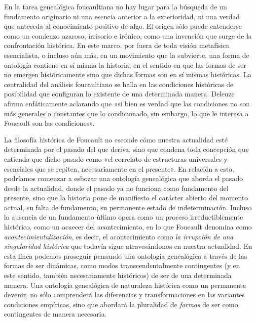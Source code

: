 En la tarea genealógica foucaultiana no hay lugar para la búsqueda de un fundamento originario ni una esencia anterior a la exterioridad, ni una verdad que anteceda al conocimiento positivo de algo. El origen sólo puede entenderse como un comienzo azaroso, irrisorio e irónico, como una invención que surge de la confrontación histórica. En este marco, por fuera de toda visión metafísica esencialista, o incluso aún más, en un movimiento que la subvierte, una forma de ontología contiene en sí misma la historia, en el sentido en que las formas de ser no emergen históricamente sino que dichas formas son en sí mismas históricas. La centralidad del análisis foucaultiano se halla en las condiciones históricas de posibilidad que configuran lo existente de una determinada manera. Deleuze afirma enfáticamente aclarando que «si bien es verdad que las condiciones no son más generales o constantes que lo condicionado, sin embargo, lo que le interesa a Foucault son las condiciones».

La filosofía histórica de Foucault no esconde cómo nuestra actualidad esté determinada por el pasado del que deriva, sino que condena toda concepción que entienda que dicho pasado como «el correlato de estructuras universales y esenciales que se repiten, necesariamente en el presente». En relación a esto, podríamos comenzar a esbozar una ontología genealógica que aborda el pasado desde la actualidad, donde el pasado ya no funciona como fundamento del presente, sino que la historia pone de manifiesto el carácter abierto del momento actual, su falta de fundamento, su permanente estado de indeterminación. Incluso la ausencia de un fundamento último opera como un proceso irreductiblemente histórico, como un acaecer del acontecimiento, en lo que Foucault denomina como \emph{acontecimientalización}, es decir, el acontecimiento como \emph{la irrupción de una singularidad histórica} que todavía sigue atravesándonos en nuestra actualidad. En esta línea podemos proseguir pensando una ontología genealógica a través de las formas de ser dinámicas, como modos transcendentalmente contingentes (y en este sentido, también necesariamente históricos) de ser de una determinada manera. Una ontología genealógica de naturaleza histórica como un permanente devenir, no sólo comprenderá las diferencias y transformaciones en las variantes condiciones empíricas, sino que abordará la pluralidad de \emph{formas} de ser como contingentes de manera necesaria.

